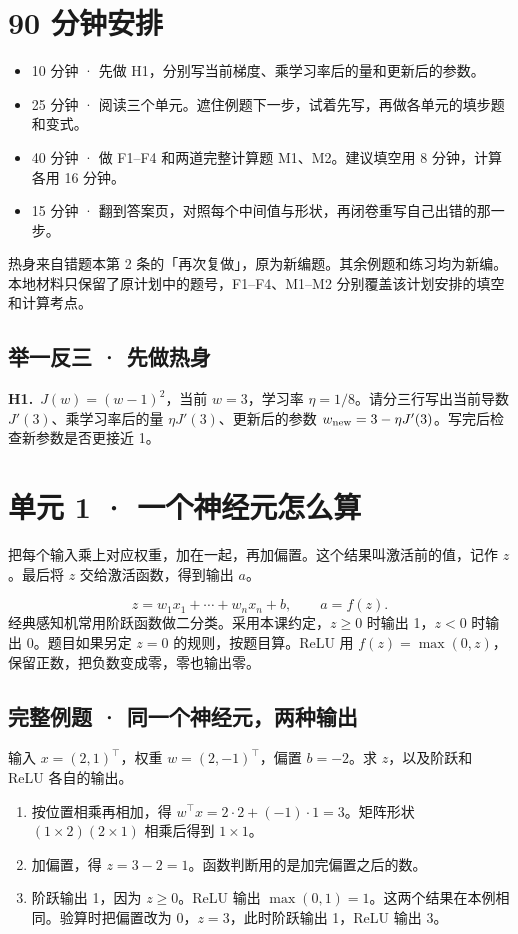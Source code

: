 \documentclass[UTF8,a4paper,11pt]{ctexart}
\newcommand{\CompactQuestion}[2]{\par\noindent\textbf{#1.}\ #2\par\vspace{.8em}}
\begin{document}
\section{90 分钟安排}
\begin{itemize}
\item 10 分钟 · 先做 H1，分别写当前梯度、乘学习率后的量和更新后的参数。
\item 25 分钟 · 阅读三个单元。遮住例题下一步，试着先写，再做各单元的填步题和变式。
\item 40 分钟 · 做 F1–F4 和两道完整计算题 M1、M2。建议填空用 8 分钟，计算各用 16 分钟。
\item 15 分钟 · 翻到答案页，对照每个中间值与形状，再闭卷重写自己出错的那一步。
\end{itemize}
热身来自错题本第 2 条的「再次复做」，原为新编题。其余例题和练习均为新编。本地材料只保留了原计划中的题号，F1–F4、M1–M2 分别覆盖该计划安排的填空和计算考点。

\subsection{举一反三 · 先做热身}
\CompactQuestion{H1}{$J(w)=(w-1)^2$，当前 $w=3$，学习率 $\eta=1/8$。请分三行写出当前导数 $J'(3)$、乘学习率后的量 $\eta J'(3)$、更新后的参数 $w_{\rm new}=3-\eta J'(3)$。写完后检查新参数是否更接近 1。}
\clearpage
\section{单元 1 · 一个神经元怎么算}
把每个输入乘上对应权重，加在一起，再加偏置。这个结果叫激活前的值，记作 $z$。最后将 $z$ 交给激活函数，得到输出 $a$。

\[z=w_1x_1+\cdots+w_nx_n+b,\qquad a=f(z).\]
经典感知机常用阶跃函数做二分类。采用本课约定，$z\ge 0$ 时输出 1，$z<0$ 时输出 0。题目如果另定 $z=0$ 的规则，按题目算。ReLU 用 $f(z)=\max(0,z)$，保留正数，把负数变成零，零也输出零。

\subsection{完整例题 · 同一个神经元，两种输出}
输入 $x=(2,1)^\top$，权重 $w=(2,-1)^\top$，偏置 $b=-2$。求 $z$，以及阶跃和 ReLU 各自的输出。

\begin{enumerate}
\item 按位置相乘再相加，得 $w^\top x=2\cdot2+(-1)\cdot1=3$。矩阵形状 $(1\times2)(2\times1)$ 相乘后得到 $1\times1$。
\item 加偏置，得 $z=3-2=1$。函数判断用的是加完偏置之后的数。
\item 阶跃输出 1，因为 $z\ge0$。ReLU 输出 $\max(0,1)=1$。这两个结果在本例相同。验算时把偏置改为 $0$，$z=3$，此时阶跃输出 1，ReLU 输出 3。
\end{enumerate}
\end{document}
